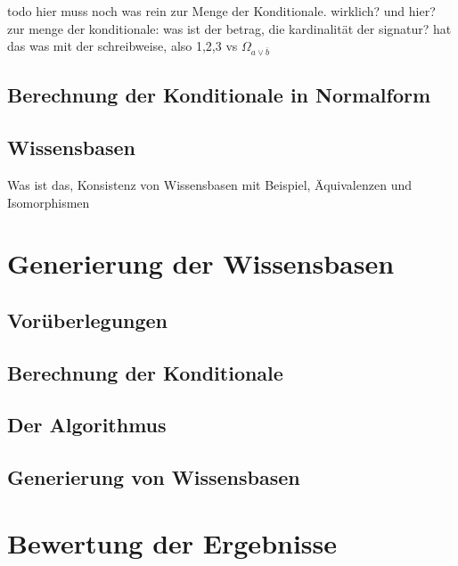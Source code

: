\documentclass[12pt,a4paper]{article}
\begin{document}
 todo hier muss noch was rein zur Menge der Konditionale. wirklich? und hier? \\
 zur menge der konditionale: was ist der betrag, die kardinalität der signatur? hat das was mit der schreibweise, also {1,2,3} vs $\Omega_{a\vee \overline{b}}$
\subsection{Berechnung der Konditionale in Normalform}

\subsection{Wissensbasen}
Was ist das, Konsistenz von Wissensbasen mit Beispiel, Äquivalenzen und Isomorphismen
\section{Generierung der Wissensbasen}
\subsection{Vorüberlegungen}
\subsection{Berechnung der Konditionale}
\subsection{Der Algorithmus}
\subsection{Generierung von Wissensbasen}
\section{Bewertung der Ergebnisse}

\newpage

 
\end{document}
